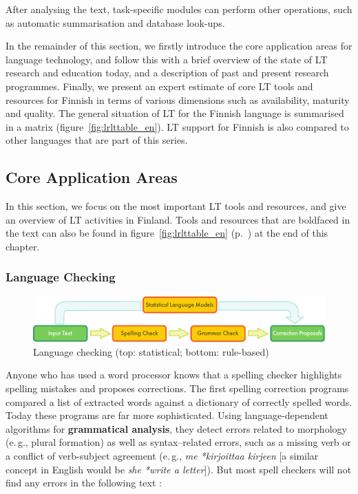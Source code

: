 \begin{multicols}{2}
After analysing the text, task-specific modules can perform other operations, such as automatic summarisation and database look-ups.

In the remainder of this section, we firstly introduce the core application areas for language technology, and follow this with a brief overview of the state of LT research and education today, and a description of past and present research programmes. Finally, we present an expert estimate of core LT tools and resources for Finnish in terms of various dimensions such as availability, maturity and quality. The general situation of LT for the Finnish language is summarised in a matrix (figure~\ref{fig:lrlttable_en}).  LT support for Finnish is also compared to other languages that are part of this series.

\subsection{Core Application Areas}

In this section, we focus on the most important LT tools and
resources, and give an overview of LT activities in Finland. 
Tools and resources that are boldfaced in the text can also be found in figure~\ref{fig:lrlttable_en} (p.~\pageref{fig:lrlttable_en}) at the end of this chapter. 

\subsubsection{Language Checking}

\begin{figure}[b]
  \center
  \includegraphics[width=\textwidth]{../_media/english/language_checking}
  \caption{Language checking (top: statistical; bottom: rule-based)}
\label{fig:langcheckingarch_en}
\end{figure}

Anyone who has used a word processor knows that a spelling checker highlights spelling mistakes and proposes corrections.  The first spelling correction programs compared a list of extracted words against a dictionary of correctly spelled words. Today these programs are far more sophisticated. Using language-dependent algorithms for \textbf{grammatical analysis}, they detect errors related to morphology (e.\,g., plural formation) as well as syntax–related errors, such as a missing verb or a conflict of verb-subject agreement (e.\,g., \textit{\foreignlanguage{finnish}{\textit{me *kirjoittaa kirjeen}}} [a similar concept in English would be \textit{she *write a letter}]).  But most spell checkers will not find any errors in the following text \cite{Surprise}:


\end{multicols}
